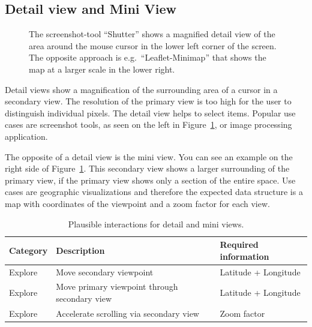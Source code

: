 \subsection{Detail view and Mini View}
\begin{figure}
  \centering
  \qquad
  \caption{
    The screenshot-tool ``Shutter'' shows a magnified detail view of the area around the mouse cursor in the lower left corner of the screen.
  The opposite approach is e.g.\ ``Leaflet-Minimap'' that shows the map at a larger scale in the lower right.
  }
  \label{fig:analysis:detail}
\end{figure}

Detail views show a magnification of the surrounding area of a cursor in a secondary view.
The resolution of the primary view is too high for the user to distinguish individual pixels.
The detail view helps to select items.
Popular use cases are screenshot tools, as seen on the left in Figure~\ref{fig:analysis:detail}, or image processing application.

The opposite of a detail view is the mini view.
You can see an example on the right side of Figure~\ref{fig:analysis:detail}.
This secondary view shows a larger surrounding of the primary view, if the primary view shows only a section of the entire space.
Use cases are geographic visualizations and therefore the expected data structure is a map with coordinates of the viewpoint and a zoom factor for each view.

\begin{table}[H]
  \caption{Plausible interactions for detail and mini views.}%
  \label{fig:analysis:detail:interactions}
  \begin{tabularx}{\linewidth}{lXX}
    \bf Category & \bf Description & \bf Required information \\
    \hline
    Explore & Move secondary viewpoint & Latitude + Longitude \\
    Explore & Move primary viewpoint through secondary view & Latitude + Longitude \\
    Explore & Accelerate scrolling via secondary view & Zoom factor \\
  \end{tabularx}
\end{table}

